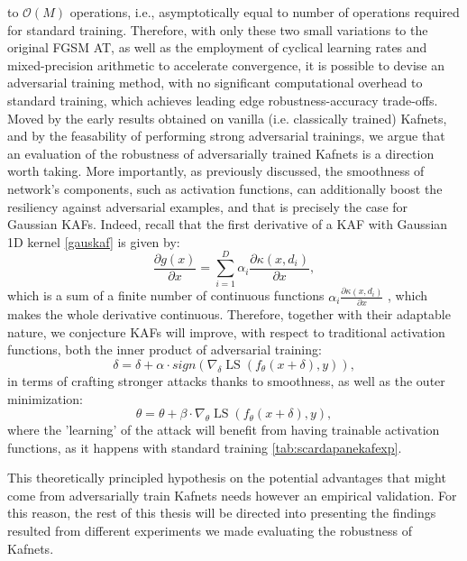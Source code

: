 \documentclass[LaM,binding=0.6cm]{./packages/sapthesis/sapthesis}
\begin{document}
        to $\mathcal{O}(M)$ operations, i.e., asymptotically equal to number of operations required for standard training.
        Therefore, with only these two small variations to the original FGSM AT, as well as the employment of cyclical learning 
        rates and mixed-precision arithmetic to accelerate convergence, it is possible to devise an 
        adversarial training method, with no significant computational overhead to standard training,
        which achieves leading edge robustness-accuracy trade-offs.
        \newpage
        Moved by the early results obtained on vanilla (i.e. classically trained) Kafnets, and by the 
        feasability of performing strong adversarial trainings, we argue that an evaluation of the robustness of adversarially trained 
        Kafnets is a direction worth taking. More importantly, as previously discussed, the smoothness of network's components, such as 
        activation functions, can additionally boost the resiliency against adversarial examples, and that is precisely the case for Gaussian 
        KAFs. Indeed, recall that the first derivative of a KAF with Gaussian 1D kernel \ref{gauskaf} is given by:
        \begin{equation}
            \frac{\partial g(x)}{\partial x}=\sum_{i=1}^{D} \alpha_{i} \frac{\partial \kappa\left(x, d_{i}\right)}{\partial x},
        \end{equation}
        which is a sum of a finite number of continuous functions $\alpha_{i} \frac{\partial \kappa\left(x, d_{i}\right)}{\partial x}$
        , which makes the whole derivative continuous. Therefore, together with their adaptable nature, we conjecture
        KAFs will improve, with respect to traditional activation functions, both the inner product of adversarial training:
        \begin{equation}
            \delta = \delta + \alpha \cdot sign(\nabla_{\delta}\operatorname{LS}(f_\theta(x + \delta), y)),
        \end{equation}
        in terms of crafting stronger attacks thanks to smoothness, as well as the outer minimization:
        \begin{equation}
            \theta = \theta + \beta \cdot \nabla_{\theta}\operatorname{LS}(f_\theta(x + \delta), y),
        \end{equation}
        where the 'learning' of the attack will benefit from having trainable activation functions, as it happens with standard training
        \ref{tab:scardapanekafexp}.

        This theoretically principled hypothesis on the potential advantages that might come from adversarially train Kafnets 
        needs however an empirical validation. For this reason, the rest of this thesis will be directed into presenting 
        the findings resulted from different experiments we made evaluating the robustness of Kafnets.
\end{document}
